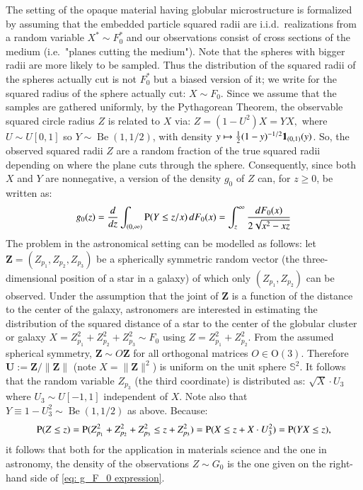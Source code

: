 The setting of the opaque material having globular microstructure is formalized by assuming that the embedded particle squared radii are i.i.d.\ realizations from a random variable $X^* \sim F^*_0$ and our observations consist of cross sections of the medium (i.e.\ "planes cutting the medium"). Note that the spheres with bigger radii are more likely to be sampled. Thus the distribution of the squared radii of the spheres actually cut is not $F^*_0$ but a biased version of it; we write for the squared radius of the sphere actually cut: $X \sim F_0$. Since we assume that the samples are gathered uniformly, by the Pythagorean Theorem, the observable squared circle radius $Z$ is related to $X$ via: $ Z = (1-U^2) X = Y X,$ where $U \sim U[0,1]$ so $Y \sim \operatorname{Be}(1,1/2)$, with density $y \mapsto \frac{1}{2} (1-y)^{-1/2} \mathbf{1}_{(0,1)}(y)$. So, the observed squared radii $Z$ are a random fraction of the true squared radii depending on where the plane cuts through the sphere. Consequently, since both $X$ and $Y$ are nonnegative, a version of the density $g_0$ of $Z$ can, for $z\geq 0$, be written as:
\begin{align}\label{eq: g_F_0 expression}
	g_0 (z) = \frac{d}{dz} \int_{(0,\infty)} \mathrm{P}(Y \leq z/x ) \, dF_0(x) =\int_{z}^{\infty} \frac{dF_0(x)}{2\sqrt{x^2 - xz}}
\end{align}
The problem in the astronomical setting can be modelled as follows: let $\mathbf{Z}= (Z_{p_1}, Z_{p_2},Z_{p_3})$ be a spherically symmetric random vector (the three-dimensional position of a star in a galaxy) of which only $(Z_{p_1}, Z_{p_2})$ can be observed. Under the assumption that the joint of $\mathbf{Z}$ is a function of the distance to the center of the galaxy, astronomers are interested in estimating the distribution of the squared distance of a star to the center of the globular cluster or galaxy $X = Z^2_{p_1}+ Z^2_{p_2}+Z^2_{p_3} \sim F_0$ using $Z = Z^2_{p_1}+ Z^2_{p_2}$. From the assumed spherical symmetry, $\mathbf{Z}
\sim O \mathbf{Z}$ for all orthogonal matrices $O \in \mathrm{O}(3)$. Therefore $\mathbf{U} := \mathbf{Z} / \|\mathbf{Z}\|$ (note $X = \|\mathbf{Z}\|^2$) is uniform on the unit sphere $\mathbb{S}^2$. It follows that the random variable $Z_{p_3}$ (the third coordinate) is distributed as: $\sqrt{X} \cdot U_3$ where $U_3 \sim U[-1,1]$ independent of $X$. Note also that $Y \equiv 1-U_3^2 \sim \operatorname{Be}(1,1/2)$ as above. Because:
\begin{align*}
	\mathrm{P} (Z \leq z) = \mathrm{P} ( Z^2_{p_1}+ Z^2_{p_2}+Z^2_{p_3} \leq z + Z^2_{p_3}) = \mathrm{P} (X \leq z + X \cdot U_3^2) = \mathrm{P} (YX \leq z),
\end{align*}
it follows that both for the application in materials science and the one in astronomy, the density of the observations $Z \sim G_0$ is the one given on the right-hand side of \eqref{eq: g_F_0 expression}.

